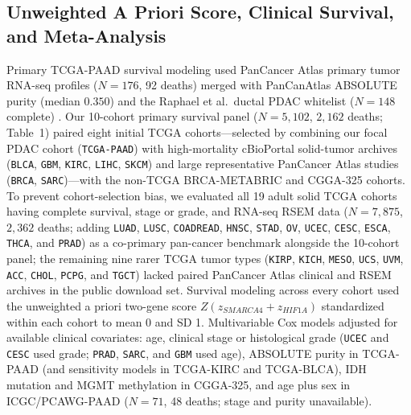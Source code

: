 \documentclass[10pt,twocolumn]{article}
\begin{document}
\subsection{Unweighted A Priori Score, Clinical Survival, and Meta-Analysis}
Primary TCGA-PAAD survival modeling used PanCancer Atlas primary tumor RNA-seq profiles ($N = 176$, 92 deaths) merged with PanCanAtlas ABSOLUTE purity (median $0.350$) and the Raphael et al.\ ductal PDAC whitelist ($N = 148$ complete) \cite{raphael2017}. Our 10-cohort primary survival panel ($N = 5,102$, $2,162$ deaths; Table~1) paired eight initial TCGA cohorts---selected by combining our focal PDAC cohort (\texttt{TCGA-PAAD}) with high-mortality cBioPortal solid-tumor archives (\texttt{BLCA}, \texttt{GBM}, \texttt{KIRC}, \texttt{LIHC}, \texttt{SKCM}) and large representative PanCancer Atlas studies (\texttt{BRCA}, \texttt{SARC})---with the non-TCGA BRCA-METABRIC \cite{curtis2012} and CGGA-325 \cite{cgga2021} cohorts. To prevent cohort-selection bias, we evaluated all 19 adult solid TCGA cohorts having complete survival, stage or grade, and RNA-seq RSEM data ($N = 7,875$, $2,362$ deaths; adding \texttt{LUAD}, \texttt{LUSC}, \texttt{COADREAD}, \texttt{HNSC}, \texttt{STAD}, \texttt{OV}, \texttt{UCEC}, \texttt{CESC}, \texttt{ESCA}, \texttt{THCA}, and \texttt{PRAD}) as a co-primary pan-cancer benchmark alongside the 10-cohort panel; the remaining nine rarer TCGA tumor types (\texttt{KIRP}, \texttt{KICH}, \texttt{MESO}, \texttt{UCS}, \texttt{UVM}, \texttt{ACC}, \texttt{CHOL}, \texttt{PCPG}, and \texttt{TGCT}) lacked paired PanCancer Atlas clinical and RSEM archives in the public download set. Survival modeling across every cohort used the unweighted a priori two-gene score $Z(z_{\textit{SMARCA4}} + z_{\textit{HIF1A}})$ standardized within each cohort to mean 0 and SD 1. Multivariable Cox models adjusted for available clinical covariates: age, clinical stage or histological grade (\texttt{UCEC} and \texttt{CESC} used grade; \texttt{PRAD}, \texttt{SARC}, and \texttt{GBM} used age), ABSOLUTE purity in TCGA-PAAD (and sensitivity models in TCGA-KIRC and TCGA-BLCA), IDH mutation and MGMT methylation in CGGA-325, and age plus sex in ICGC/PCAWG-PAAD ($N = 71$, 48 deaths; stage and purity unavailable).
\end{document}
